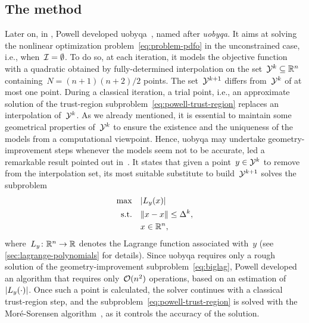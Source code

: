 \subsection{The  method}
\label{subsec:uobyqa}

Later on, in , Powell developed \gls{uobyqa}~\cite{Powell_2002}, named after \emph{\glsdesc{uobyqa}}.
It aims at solving the nonlinear optimization problem~\cref{eq:problem-pdfo} in the unconstrained case, i.e., when~$\mathcal{I} = \emptyset$.
To do so, at each iteration, it models the objective function with a quadratic obtained by fully-determined interpolation on the set~$\xpt[k] \subseteq \R^n$ containing~$N = (n + 1)(n + 2) / 2$ points.
The set~$\xpt[k + 1]$ differs from~$\xpt[k]$ of at most one point.
During a classical iteration, a trial point, i.e., an approximate solution of the trust-region subproblem~\cref{eq:powell-trust-region} replaces an interpolation of~$\xpt[k]$.
As we already mentioned, it is essential to maintain some geometrical properties of~$\xpt[k]$ to ensure the existence and the uniqueness of the models from a computational viewpoint.
Hence, \gls{uobyqa} may undertake geometry-improvement steps whenever the models seem not to be accurate, led a remarkable result pointed out in~\cite{Powell_2001}.
It states that given a point~$y \in \xpt[k]$ to remove from the interpolation set, its most suitable substitute to build~$\xpt[k + 1]$ solves the subproblem
\begin{subequations}
    \label{eq:biglag}
    \begin{align}
        \max        & \quad \abs{\lagp[y](x)}\\
        \text{s.t.} & \quad \norm{x - \iter} \le \rad[k],\\
                    & \quad x \in \R^n,
    \end{align}
\end{subequations}
where~$\lagp[y] \colon \R^n \to \R$ denotes the Lagrange function associated with~$y$ (see \cref{sec:lagrange-polynomials} for details).
Since \gls{uobyqa} requires only a rough solution of the geometry-improvement subproblem~\cref{eq:biglag}, Powell developed an algorithm that requires only~$\operatorname{\mathcal{O}}(n^2)$ operations, based on an estimation of~$\abs{\lagp[y](\cdot)}$.
Once such a point is calculated, the solver continues with a classical trust-region step, and the subproblem~\cref{eq:powell-trust-region} is solved with the Mor{\'{e}}-Sorensen algorithm~\cite{More_Sorensen_1983}, as it controls the accuracy of the solution.

